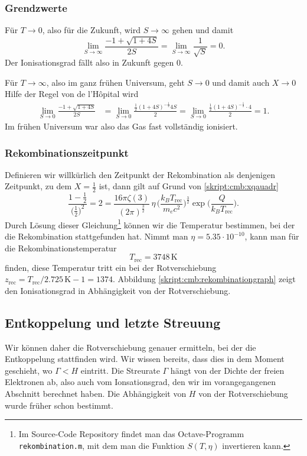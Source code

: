 \subsubsection{Grendzwerte}
Für $T\to 0$, also für die Zukunft, wird $S\to \infty$ gehen
und damit
\[
\lim_{S\to\infty}\frac{-1+\sqrt{1+4S}}{2S}
=
\lim_{S\to\infty}\frac{1}{\sqrt{S}}
=
0.
\]
Der Ionisationsgrad fällt also in Zukunft gegen 0.

Für $T\to\infty$, also im ganz frühen Universum, geht $S\to 0$
und damit auch $X\to 0$
Hilfe der Regel von de l'H\^opital wird
\begin{align*}
\lim_{S\to 0}\frac{-1+\sqrt{1+4S}}{2S}
&=
\lim_{S\to 0}
\frac{\frac12(1+4S)^{-\frac12} 4S}{2}
=
\lim_{S\to 0}
\frac{\frac12(1+4S)^{-\frac12}\cdot 4}{2}
=
1.
\end{align*}
Im frühen Universum war also das Gas fast vollständig ionisiert.

\subsubsection{Rekombinationszeitpunkt}
Definieren wir willkürlich den Zeitpunkt der Rekombination als
denjenigen Zeitpunkt, zu dem $X=\frac12$ ist, dann gilt auf Grund
von \eqref{skript:cmb:xqauadr}
\[
\frac{1-\frac12}{\bigl(\frac12\bigr)^2}
=
2
=
\frac{16\pi\zeta(3)}{(2\pi)^{\frac32}}
\,
\eta
\,
\biggl(\frac{k_BT_\text{rec}}{m_ec^2}\biggr)^{\frac32}
\exp\biggl( \frac{Q}{k_BT_\text{rec}} \biggr).
\]
Durch Lösung dieser Gleichung\footnote{Im Source-Code Repository findet
man das Octave-Programm \texttt{rekombination.m}, mit dem man die
Funktion $S(T,\eta)$ invertieren kann.}
können wir die Temperatur bestimmen,
bei der die Rekombination stattgefunden hat.
Nimmt man $\eta=5.35\cdot 10^{-10}$, kann man für die Rekombinationstemperatur
\[
T_\text{rec} = 3748\,\text{K}
\]
finden, diese Temperatur tritt ein bei der Rotverschiebung
$z_{\text{rec}} = T_\text{rec}/2.725\,\text{K} -1 = 1374$.
Abbildung \ref{skript:cmb:rekombinationgraph} zeigt den Ionisationsgrad
in Abhängigkeit von der Rotverschiebung.

\subsection{Entkoppelung und letzte Streuung}
Wir können daher die Rotverschiebung genauer ermitteln,
bei der die Entkoppelung stattfinden wird.
Wir wissen bereits, dass dies in dem Moment geschieht, wo
$\Gamma < H$ eintritt.
Die Streurate $\Gamma$ hängt von der Dichte der freien Elektronen
ab, also auch vom Ionsationsgrad, den wir im vorangegangenen Abschnitt
berechnet haben.
Die Abhängigkeit von $H$ von der Rotverschiebung wurde früher schon
bestimmt.

